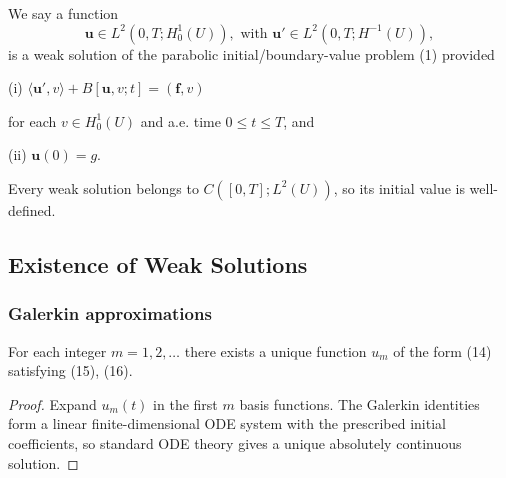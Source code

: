 \begin{definition}
\label{def:weak-solution-parabolic-bvp}

We say a function
\[
\mathbf{u} \in L^2(0,T; H_0^1(U)), \text{ with } \mathbf{u}' \in L^2(0,T; H^{-1}(U)),
\]
is a weak solution of the parabolic initial/boundary-value problem (1) provided

\quad (i) $\langle \mathbf{u}', v \rangle + B[\mathbf{u},v;t] = (\mathbf{f},v)$

for each $v \in H_0^1(U)$ and a.e. time $0 \le t \le T$, and

\quad (ii) $\mathbf{u}(0) = g$.
\end{definition}

\begin{remark}
\label{rem:weak-solution-parabolic-continuity}

Every weak solution belongs to $C([0,T];L^2(U))$, so its initial value is well-defined.
\end{remark}

\subsection{Existence of Weak Solutions}

\subsubsection{Galerkin approximations}

\begin{theorem}
\label{thm:parabolic-galerkin-approximate-solutions}
For each integer $m = 1, 2, \ldots$ there exists a unique function $u_m$ of the form (14) satisfying (15), (16).
\end{theorem}

\begin{proof}
\sketch Expand $u_m(t)$ in the first $m$ basis functions. The Galerkin identities form a linear finite-dimensional ODE system with the prescribed initial coefficients, so standard ODE theory gives a unique absolutely continuous solution.
\end{proof}

